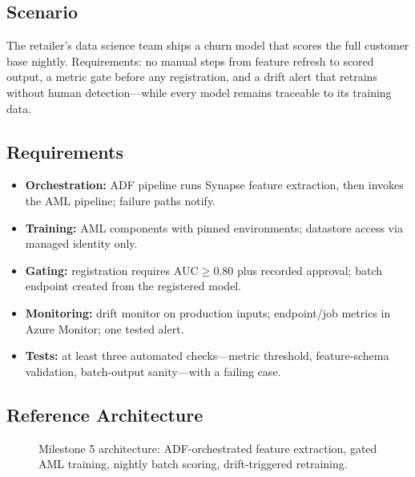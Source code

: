 \subsection*{Scenario}
The retailer's data science team ships a churn model that scores the full customer base nightly. Requirements: no manual steps from feature refresh to scored output, a metric gate before any registration, and a drift alert that retrains without human detection---while every model remains traceable to its training data.

\subsection*{Requirements}
\begin{itemize}
    \item \textbf{Orchestration:} ADF pipeline runs Synapse feature extraction, then invokes the AML pipeline; failure paths notify.
    \item \textbf{Training:} AML components with pinned environments; datastore access via managed identity only.
    \item \textbf{Gating:} registration requires $\text{AUC} \ge 0.80$ plus recorded approval; batch endpoint created from the registered model.
    \item \textbf{Monitoring:} drift monitor on production inputs; endpoint/job metrics in Azure Monitor; one tested alert.
    \item \textbf{Tests:} at least three automated checks---metric threshold, feature-schema validation, batch-output sanity---with a failing case.
\end{itemize}

\subsection*{Reference Architecture}
\begin{figure}[H]
    \centering
    \caption{Milestone 5 architecture: ADF-orchestrated feature extraction, gated AML training, nightly batch scoring, drift-triggered retraining.}
    \label{fig:ch20-capstone-arch}
\end{figure}

